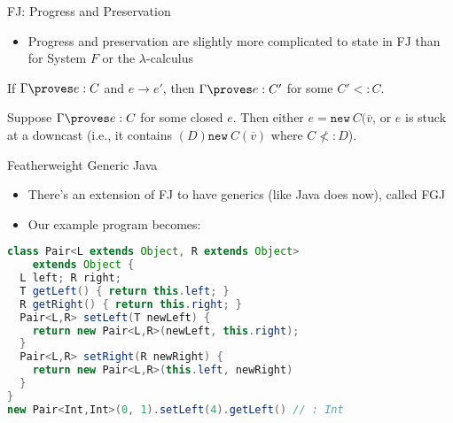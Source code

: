 \documentclass[leqno,presentation,usenames,dvipsnames]{beamer}
\newcommand{\newc}{\texttt{new}}
\begin{document}
\begin{frame}[fragile]{FJ: Progress and Preservation}
    \begin{itemize}
        \item Progress and preservation are slightly more complicated to state in FJ than for System $F$ or the $\lambda$-calculus
    \end{itemize}

    \begin{theorem}
        If $\Gamma \proves e : C$ and $e \to e'$, then $\Gamma \proves e : C'$ for some $C' <: C$.
    \end{theorem}

    \begin{theorem}[Progress]
        Suppose $\Gamma \proves e : C$ for some closed $e$.
        Then either $e = \newc~C(\overline{v}$, or $e$ is stuck at a downcast (i.e., it contains $(D)\newc~C(\overline{v})$ where $C \not<: D$).
    \end{theorem}
\end{frame}

\begin{frame}[fragile]{Featherweight Generic Java}
    \begin{itemize}
        \item There's an extension of FJ to have generics (like Java does now), called FGJ
        \item Our example program becomes:
    \end{itemize}
\begin{lstlisting}[language=java, basicstyle=\small\ttfamily]
class Pair<L extends Object, R extends Object>
    extends Object {
  L left; R right;
  T getLeft() { return this.left; }
  R getRight() { return this.right; }
  Pair<L,R> setLeft(T newLeft) {
    return new Pair<L,R>(newLeft, this.right);
  }
  Pair<L,R> setRight(R newRight) {
    return new Pair<L,R>(this.left, newRight)
  }
}
new Pair<Int,Int>(0, 1).setLeft(4).getLeft() // : Int
\end{lstlisting}
\end{frame}
\end{document}
